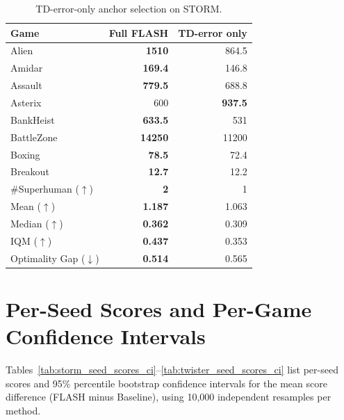 \documentclass{article} %
\begin{document}
\begin{table}[!htbp]
\centering
\small
\caption{TD-error-only anchor selection on STORM.}
\label{tab:td_error_only_ablation}
\begin{tabular}{lrr}
\toprule
Game & Full FLASH & TD-error only \\
\midrule
Alien & \textbf{1510} & 864.5 \\
Amidar & \textbf{169.4} & 146.8 \\
Assault & \textbf{779.5} & 688.8 \\
Asterix & 600 & \textbf{937.5} \\
BankHeist & \textbf{633.5} & 531 \\
BattleZone & \textbf{14250} & 11200 \\
Boxing & \textbf{78.5} & 72.4 \\
Breakout & \textbf{12.7} & 12.2 \\
\midrule
\#Superhuman ($\uparrow$) & \textbf{2} & 1 \\
Mean ($\uparrow$) & \textbf{1.187} & 1.063 \\
Median ($\uparrow$) & \textbf{0.362} & 0.309 \\
IQM ($\uparrow$) & \textbf{0.437} & 0.353 \\
Optimality Gap ($\downarrow$) & \textbf{0.514} & 0.565 \\
\bottomrule
\end{tabular}
\end{table}
\FloatBarrier

\clearpage
\section{Per-Seed Scores and Per-Game Confidence Intervals}
\label{app:seed_scores_ci}

Tables~\ref{tab:storm_seed_scores_ci}--\ref{tab:twister_seed_scores_ci} list per-seed scores and 95\% percentile bootstrap confidence intervals for the mean score difference (FLASH minus Baseline), using 10,000 independent resamples per method.
\end{document}
